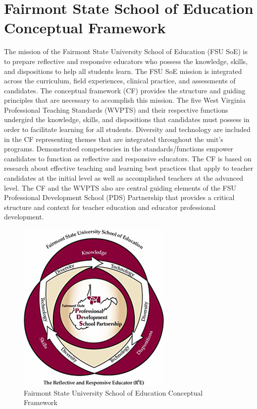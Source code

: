 \documentclass{tufte-handout}
\begin{document}
\section{Fairmont State School of Education Conceptual Framework}
The mission of the Fairmont State University School of Education (FSU SoE) is to prepare reflective and responsive educators who possess the knowledge, skills, and dispositions to help all students learn. The FSU SoE mission is integrated across the curriculum, field experiences, clinical practice, and assessments of candidates. The conceptual framework (CF) provides the structure and guiding principles that are necessary to accomplish this mission. The five West Virginia Professional Teaching Standards (WVPTS) and their respective functions undergird the knowledge, skills, and dispositions that candidates must possess in order to facilitate learning for all students. Diversity and technology are included in the CF representing themes that are integrated throughout the unit's programs. Demonstrated competencies in the standards/functions empower candidates to function as reflective and responsive educators. The CF is based on research about effective teaching and learning best practices that apply to teacher candidates at the initial level as well as accomplished teachers at the advanced level. The CF and the WVPTS also are central guiding elements of the FSU Professional Development School (PDS) Partnership that provides a critical structure and context for teacher education and educator professional development.

\begin{center}
\begin{figure}%
  \centerline{\includegraphics[width=0.5\linewidth]{fsu-cf.png}}
  \caption{Fairmont State University School of Education Conceptual Framework}
  \label{fig:fsu-cf}
\end{figure}
\end{center}
\end{document}
